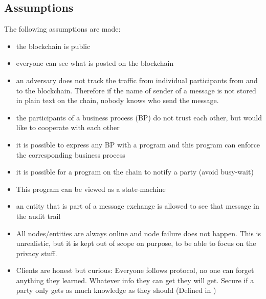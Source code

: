 \documentclass[runningheads]{llncs}
\begin{document}
\subsection{Assumptions}
The following assumptions are made: 
\begin{itemize}
    \item the blockchain is public
    \item everyone can see what is posted on the blockchain
    \item an adversary does not track the traffic from individual participants from and to the blockchain. Therefore if the name of sender of a message is not stored in plain text on the chain, nobody knows who send the message.
    \item the participants of a business process (BP) do not trust each other, but would like to cooperate with each other
    \item it is possible to express any BP with a program and this program can enforce the corresponding business process
    \item it is possible for a program on the chain to notify a party (avoid busy-wait) 
    \item This program can be viewed as a state-machine
     \item an entity that is part of a message exchange is allowed to see that message in the audit trail
     \item All nodes/entities are always online and node failure does not happen. This is unrealistic, but it is kept out of scope on purpose, to be able to focus on the privacy stuff.
     \item Clients are honest but curious: Everyone follows protocol, no one can forget anything they learned. Whatever info they can get they will get. Secure if a party only gets as much knowledge as they should (Defined in \cite{xiong2011cloudseal} \cite{paverd2014modelling})
\end{itemize}
\end{document}
